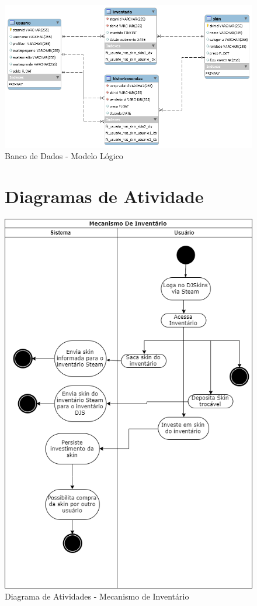   \begin{figure}[!htb]
        \centering
        \includegraphics[scale=0.6]{Imagens/Logico.png}
        \caption{Banco de Dados - Modelo Lógico}
        \label{fig:bdml}
 \end{figure}

	\begin{figure}[!htb]
		\section{Diagramas de Atividade}
		\centering
		\includegraphics[scale=0.6]{Imagens/mec-inventario.png}
		\caption{Diagrama de Atividades - Mecanismo de Inventário}
		\label{fig:dami}
	\end{figure}

